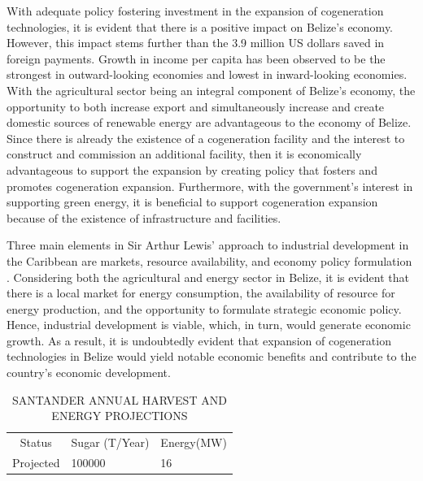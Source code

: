 \documentclass[twocolumn,10pt]{asme2e}
\begin{document}
With adequate policy fostering investment in the expansion of cogeneration technologies, it is evident that there is a positive impact on Belize's economy. However, this impact stems further than the 3.9 million US dollars saved in foreign payments. Growth in income per capita has been observed to be the strongest in outward-looking economies and lowest in inward-looking economies\cite{Crook}. With the agricultural sector being an integral component of Belize's economy, the opportunity to both increase export and simultaneously increase and create domestic sources of renewable energy are advantageous to the economy of Belize. Since there is already the existence of a cogeneration facility and the interest to construct and commission an additional facility, then it is economically advantageous to support the expansion by creating policy that fosters and promotes cogeneration expansion. Furthermore, with the government's interest in supporting green energy, it is beneficial to support cogeneration expansion because of the existence of infrastructure and facilities. 

Three main elements in Sir Arthur Lewis' approach to industrial development in the Caribbean are markets, resource availability, and economy policy formulation \cite{arthur_lewis}. Considering both the agricultural and energy sector in Belize, it is evident that there is a local market for energy consumption, the availability of resource for energy production, and the opportunity to formulate strategic economic policy. Hence, industrial development is viable, which, in turn, would generate economic growth. As a result, it is undoubtedly evident that expansion of cogeneration technologies in Belize would yield notable economic benefits and contribute to the country's economic development. 


\begin{table}[t]
\caption{SANTANDER ANNUAL HARVEST AND ENERGY PROJECTIONS}
\begin{center}
\label{table_ASME}
\begin{tabular}{c l l}
& & \\ %
\hline
Status & Sugar (T/Year) & Energy(MW)\\
\hline
Projected & 100000 & 16 \\
\hline
\end{tabular}
\end{center}
\end{table}
\end{document}
